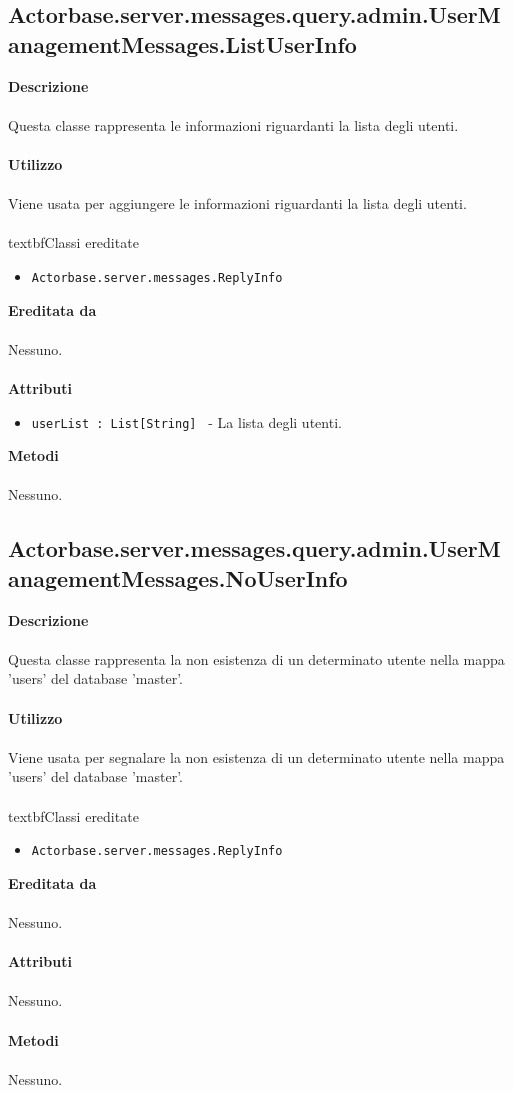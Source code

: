 \documentclass[a4paper]{article}
\begin{document}
	\subsection{Actorbase.server.messages.query.admin.UserManagementMessages.ListUserInfo}
		\textbf{Descrizione}
			\\ \\
			Questa classe rappresenta le informazioni riguardanti la lista degli utenti.
			\\ \\
		\textbf{Utilizzo}
			\\ \\
			Viene usata per aggiungere le informazioni riguardanti la lista degli utenti.
			\\ \\
		textbf{Classi ereditate}
			\begin{itemize}
				\item \texttt{Actorbase.server.messages.ReplyInfo}
			\end{itemize}
		\textbf{Ereditata da}
			\\ \\
			Nessuno.
			\\ \\
		\textbf{Attributi}
			\begin{itemize}
				\item \texttt{userList : List[String] } - La lista degli utenti.
			\end{itemize}
		\textbf{Metodi}
			\\ \\
			Nessuno.
			
	\subsection{Actorbase.server.messages.query.admin.UserManagementMessages.NoUserInfo}
		\textbf{Descrizione}
			\\ \\
			Questa classe rappresenta la non esistenza di un determinato utente nella mappa 'users' del database 'master'.
			\\ \\
		\textbf{Utilizzo}
			\\ \\
			Viene usata per segnalare la non esistenza di un determinato utente nella mappa 'users' del database 'master'.
			\\ \\
		textbf{Classi ereditate}
			\begin{itemize}
				\item \texttt{Actorbase.server.messages.ReplyInfo}
			\end{itemize}
		\textbf{Ereditata da}
			\\ \\
			Nessuno.
			\\ \\
		\textbf{Attributi}
			\\ \\
			Nessuno.
			\\ \\
		\textbf{Metodi}
			\\ \\
			Nessuno.
			
\end{document}
